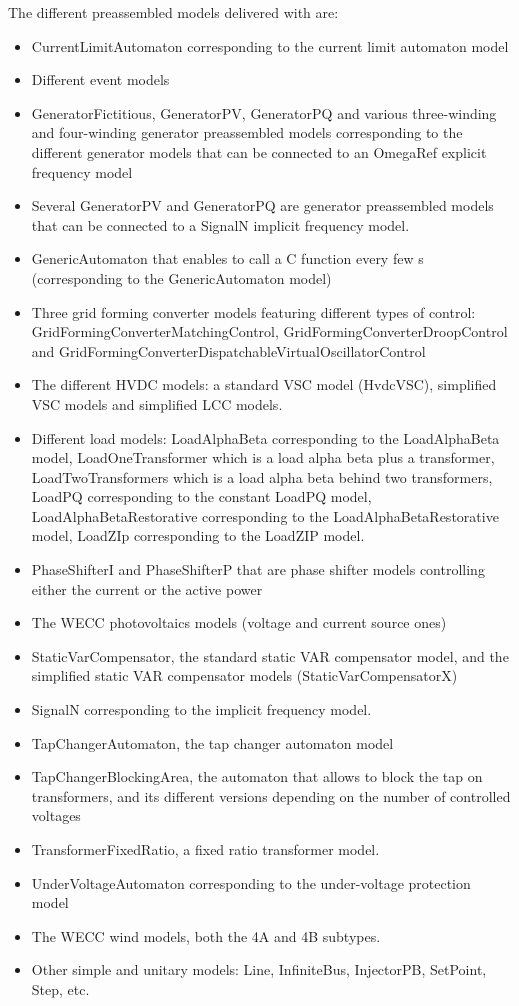 \documentclass[a4paper, 12pt]{report}
\begin{document}
The different preassembled models delivered with \Dynawo are:
\begin{itemize}
\item CurrentLimitAutomaton corresponding to the current limit automaton model
\item Different event models
\item GeneratorFictitious, GeneratorPV, GeneratorPQ and various three-winding and four-winding generator preassembled models corresponding to the different generator models that can be connected to an OmegaRef explicit frequency model
\item Several GeneratorPV and GeneratorPQ are generator preassembled models that can be connected to a SignalN implicit frequency model.
\item GenericAutomaton that enables to call a C function every few s (corresponding to the GenericAutomaton model)
\item Three grid forming converter models featuring different types of control: GridFormingConverterMatchingControl, GridFormingConverterDroopControl and GridFormingConverterDispatchableVirtualOscillatorControl
\item The different HVDC models: a standard VSC model (HvdcVSC), simplified VSC models and simplified LCC models.
\item Different load models: LoadAlphaBeta corresponding to the LoadAlphaBeta model, LoadOneTransformer which is a load alpha beta plus a transformer, LoadTwoTransformers which is a load alpha beta behind two transformers, LoadPQ corresponding to the constant LoadPQ model, LoadAlphaBetaRestorative corresponding to the LoadAlphaBetaRestorative model, LoadZIp corresponding to the LoadZIP model.
\item PhaseShifterI and PhaseShifterP that are phase shifter models controlling either the current or the active power
\item The \ac{WECC} photovoltaics models (voltage and current source ones)
\item StaticVarCompensator, the standard static VAR compensator model, and the simplified static VAR compensator models (StaticVarCompensatorX)
\item SignalN corresponding to the implicit frequency model.
\item TapChangerAutomaton, the tap changer automaton model
\item TapChangerBlockingArea, the automaton that allows to block the tap on transformers, and its different versions depending on the number of controlled voltages
\item TransformerFixedRatio, a fixed ratio transformer model.
\item UnderVoltageAutomaton corresponding to the under-voltage protection model
\item The \ac{WECC} wind models, both the 4A and 4B subtypes.
\item Other simple and unitary models: Line, InfiniteBus, InjectorPB, SetPoint, Step, etc.
\end{itemize}
\end{document}
